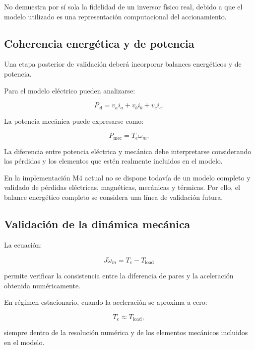 No demuestra por sí sola la fidelidad de un inversor físico real, debido a que el modelo utilizado es una representación computacional del accionamiento.

\subsection{Coherencia energética y de potencia}

Una etapa posterior de validación deberá incorporar balances energéticos y de potencia.

Para el modelo eléctrico pueden analizarse:

\begin{equation}
P_{\mathrm{el}}
=
v_ai_a+
v_bi_b+
v_ci_c.
\end{equation}

La potencia mecánica puede expresarse como:

\begin{equation}
P_{\mathrm{mec}}
=
T_e\omega_m.
\end{equation}

La diferencia entre potencia eléctrica y mecánica debe interpretarse considerando las pérdidas y los elementos que estén realmente incluidos en el modelo.

En la implementación M4 actual no se dispone todavía de un modelo completo y validado de pérdidas eléctricas, magnéticas, mecánicas y térmicas. Por ello, el balance energético completo se considera una línea de validación futura.

\subsection{Validación de la dinámica mecánica}

La ecuación:

\begin{equation}
J\dot{\omega}_m
=
T_e-T_{\mathrm{load}}
\end{equation}

permite verificar la consistencia entre la diferencia de pares y la aceleración obtenida numéricamente.

En régimen estacionario, cuando la aceleración se aproxima a cero:

\begin{equation}
T_e\approx T_{\mathrm{load}},
\end{equation}

siempre dentro de la resolución numérica y de los elementos mecánicos incluidos en el modelo.

